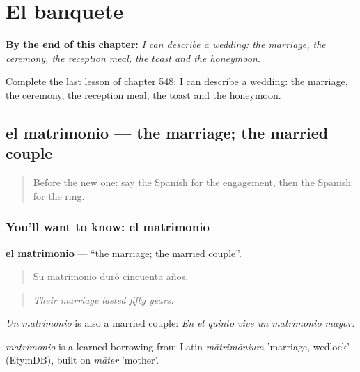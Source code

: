 
\chapter{El banquete}
\label{ch:es-el-banquete}

\begin{chapteropening}
\textbf{By the end of this chapter:} \emph{I can describe a wedding: the marriage, the ceremony, the reception meal, the toast and the honeymoon.}

Complete the last lesson of chapter 548: I can describe a wedding: the marriage, the ceremony, the reception meal, the toast and the honeymoon.
\end{chapteropening}

\section[el matrimonio]{el matrimonio — the marriage; the married couple}

\label{lesson:ES-C548-matrimonio}



\begin{quote}
Before the new one: say the Spanish for the engagement, then the Spanish for the ring.
\end{quote}

\subsection*{You'll want to know: el matrimonio}
\textbf{el matrimonio} — \textquotedblleft{}the marriage; the married couple\textquotedblright{}.

\begin{quote}
Su matrimonio duró cincuenta años.
\end{quote}

\begin{quote}
\emph{Their marriage lasted fifty years.}
\end{quote}

\emph{Un matrimonio} is also a married couple: \emph{En el quinto vive un matrimonio mayor.}

\begin{cousinweb}
\emph{matrimonio} is a learned borrowing from Latin \emph{mātrimōnium} 'marriage, wedlock' (EtymDB), built on \emph{māter} 'mother'.
\end{cousinweb}

